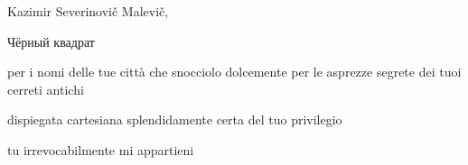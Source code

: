 \clearpage


\begin{artItem}
	Kazimir Severinovič Malevič, \begin{otherlanguage}{russian}%
		Чёрный квадрат%
	\end{otherlanguage}
\end{artItem}

\begin{poem}
	\begin{stanza}
		per i nomi delle tue città\verseline
		che snocciolo dolcemente\verseline
		per le asprezze segrete\verseline
		dei tuoi cerreti antichi
	\end{stanza}

	\begin{stanza}
		dispiegata\verseline
		cartesiana\verseline
		splendidamente certa\verseline
		del tuo privilegio
	\end{stanza}

	\begin{stanza}
		tu irrevocabilmente\verseline
		mi appartieni
	\end{stanza}
\end{poem}
